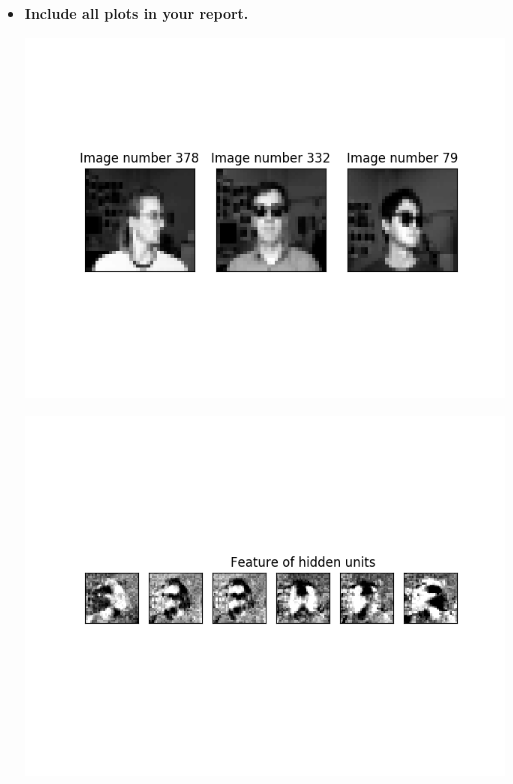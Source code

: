 \documentclass[a4paper]{article}
\begin{document}
\begin{itemize}
\item \textbf{Include all plots in your report.} \\
\begin{minipage}{0.4\textwidth}
  \includegraphics[scale=0.35]{plots/pose_recognition.png}
  \label{pose_recognition}
\end{minipage}
\hfill
\begin{minipage}{0.4\textwidth}
  \includegraphics[scale=0.35]{plots/pose_recognition_hidden_units.png}
  \label{pose_recognition_hidden_units}
\end{minipage}
\end{itemize}
\end{document}

